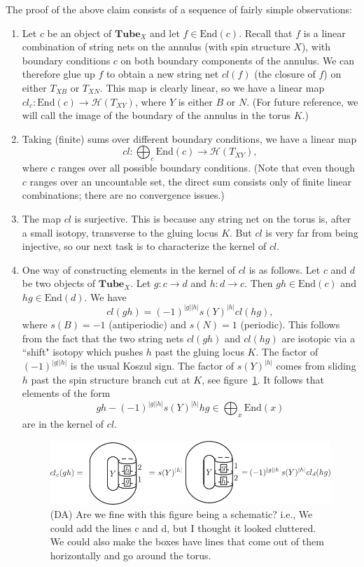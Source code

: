 \documentclass[12pt,a4paper]{article}
\newcommand{\mch}{\mathcal{H}}
\newcommand\be            {\begin{equation}}
\newcommand\ee            {\end{equation}}
\newcommand{\End}{\text{End}}
\newcommand{\tube}{\textbf{Tube}}
\newcommand{\dave}[1]{{\color{ao(english)}\footnotesize{(DA) #1}}}
\begin{document}
The proof of the above claim consists of a sequence of fairly simple observations:
\begin{enumerate}

\item Let $c$ be an object of $\tube_X$ and let $f\in\End(c)$.
Recall that $f$ is a linear combination of string nets on the annulus (with spin structure $X$), with boundary conditions
$c$ on both boundary components of the annulus.
We can therefore glue up $f$ to obtain a new string net $cl(f)$ (the closure of $f$) on either $T_{XB}$ or $T_{XN}$.
This map is clearly linear, so we have a linear map $cl_c : \End(c) \to \mch(T_{XY})$, where $Y$ is either $B$ or $N$.
(For future reference, we will call the image of the boundary of the annulus in the torus $K$.)

\item Taking (finite) sums over different boundary conditions, we have a linear map
\be
	cl : \bigoplus_c \End(c) \to \mch(T_{XY}) ,
\ee
where $c$ ranges over all possible boundary conditions.
(Note that even though $c$ ranges over an uncountable set, the direct sum consists only of finite linear combinations; 
there are no convergence issues.)

\item The map $cl$ is surjective.
This is because any string net on the torus is, after a small isotopy, 
transverse to the gluing locus $K$.
But $cl$ is very far from being injective, so our next task is to characterize the kernel of $cl$.

\item One way of constructing elements in the kernel of $cl$ is as follows.
Let $c$ and $d$ be two objects of $\tube_X$.
Let $g: c\to d$ and $h: d\to c$.
Then $gh \in \End(c)$ and $hg \in \End(d)$.
We have
\be
	cl(gh) = (-1)^{|g| |h|} s(Y)^{|h|} cl(hg) ,
\ee
where $s(B) = -1$ (antiperiodic) and $s(N) = 1$ (periodic).
This follows from the fact that the two string nets $cl(gh)$ and $cl(hg)$ are isotopic
via a ``shift" isotopy which pushes $h$ past the gluing locus $K$.
The factor of $(-1)^{|g| |h|}$ is the usual Koszul sign.
The factor of $s(Y)^{|h|}$ comes from sliding $h$ past the spin structure branch cut at $K$, see figure~\ref{KernalCl}.
It follows that elements of the form
\be \label{cl_ker}
	gh - (-1)^{|g| |h|} s(Y)^{|h|} hg \in \bigoplus_x \End(x)
\ee
are in the kernel of $cl$.
\begin{figure}
\begin{center}
\includegraphics{KernalCl.pdf}
\caption{\dave{Are we fine with this figure being a schematic? 
i.e., We could add the lines c and d, but I thought it looked cluttered. 
We could also make the boxes have lines that come out 
of them horizontally and go around the torus.}}
\end{center}
\label{KernalCl} 
\end{figure}


\end{enumerate}
\end{document}
